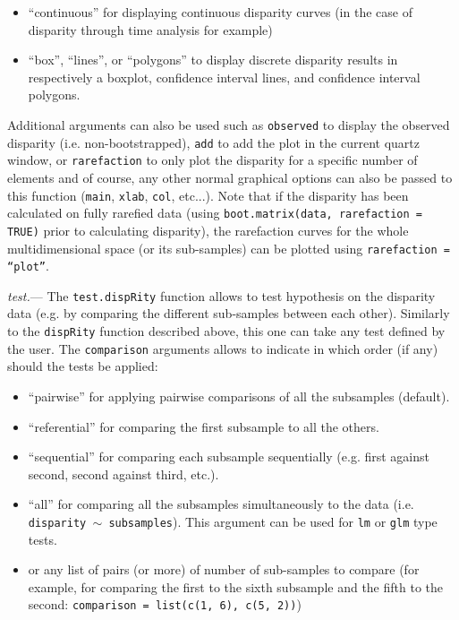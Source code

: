 \documentclass[12pt,letterpaper]{article}
\renewcommand{\subsubsection}[1]{%
\vspace{2ex}
\noindent
\textit{#1.}---}
\newcommand{\disp}{\texttt{dispRity} }
\begin{document}
\begin{itemize}
    \item ``continuous'' for displaying continuous disparity curves (in the case of disparity through time analysis for example)
    \item ``box'', ``lines'', or ``polygons'' to display discrete disparity results in respectively a boxplot, confidence interval lines, and confidence interval polygons.
\end{itemize}

Additional arguments can also be used such as \texttt{observed} to display the observed disparity (i.e. non-bootstrapped), \texttt{add} to add the plot in the current quartz window, or \texttt{rarefaction} to only plot the disparity for a specific number of elements and of course, any other normal graphical options can also be passed to this function (\texttt{main}, \texttt{xlab}, \texttt{col}, etc...).
Note that if the disparity has been calculated on fully rarefied data (using \texttt{boot.matrix(data, rarefaction = TRUE)} prior to calculating disparity), the rarefaction curves for the whole multidimensional space (or its sub-samples) can be plotted using \texttt{rarefaction = ``plot''}.

\subsubsection{test}
The \texttt{test.dispRity} function allows to test hypothesis on the disparity data (e.g. by comparing the different sub-samples between each other).
Similarly to the \disp function described above, this one can take any test defined by the user.
The \texttt{comparison} arguments allows to indicate in which order (if any) should the tests be applied:

\begin{itemize}
    \item ``pairwise'' for applying pairwise comparisons of all the subsamples (default).
    \item ``referential'' for comparing the first subsample to all the others.
    \item ``sequential'' for comparing each subsample sequentially (e.g. first against second, second against third, etc.).
    \item ``all'' for comparing all the subsamples simultaneously to the data (i.e. \texttt{disparity $\mathtt{\sim}$ subsamples}). This argument can be used for \texttt{lm} or \texttt{glm} type tests.
    \item or any list of pairs (or more) of number of sub-samples to compare (for example, for comparing the first to the sixth subsample and the fifth to the second: \texttt{comparison = list(c(1, 6), c(5, 2))})
\end{itemize}
\end{document}
